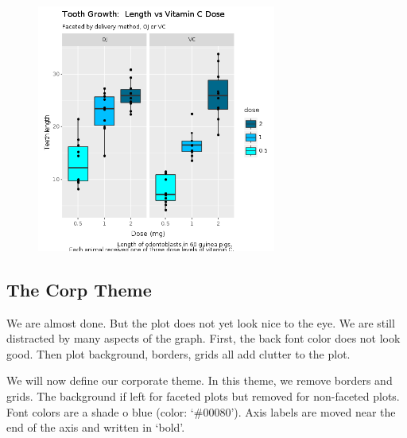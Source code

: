 \documentclass[11pt,]{article}
\begin{document}
\begin{figure}
\centering
\includegraphics[width=0.70000\textwidth]{figures/facets_with_decorations.png}
\caption{}
\end{figure}

\subsection{The Corp Theme}\label{the-corp-theme}

We are almost done. But the plot does not yet look nice to the eye. We
are still distracted by many aspects of the graph. First, the back font
color does not look good. Then plot background, borders, grids all add
clutter to the plot.

We will now define our corporate theme. In this theme, we remove borders
and grids. The background if left for faceted plots but removed for
non-faceted plots. Font colors are a shade o blue (color: `\#00080').
Axis labels are moved near the end of the axis and written in `bold'.
\end{document}
